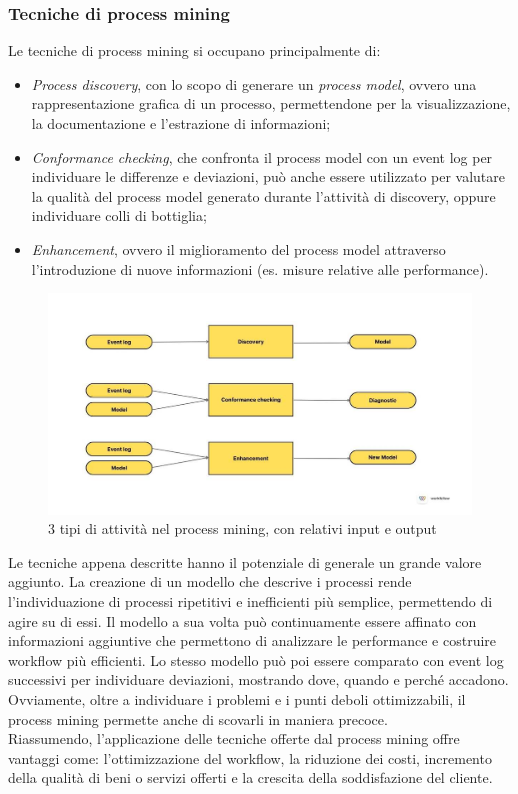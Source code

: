 \subsubsection{Tecniche di process mining}
Le tecniche di process mining si occupano principalmente di:
\begin{itemize}
\item \textit{Process discovery}, con lo scopo di generare un \textit{process model}, ovvero una rappresentazione grafica di un processo, permettendone per la visualizzazione, la documentazione e l'estrazione di informazioni;

\item \textit{Conformance checking}, che confronta il process model con un event log per individuare le differenze e deviazioni, può anche essere utilizzato per valutare la qualità del process model generato durante l'attività di discovery, oppure individuare colli di bottiglia;

\item \textit{Enhancement}, ovvero il miglioramento del process model attraverso l'introduzione di nuove informazioni (es. misure relative alle performance).
\end{itemize}

\begin{figure}[H] 
    \centering 
    \includegraphics[width=0.9\columnwidth]{immagini/process_mining_techniques.jpg} 
    \caption{3 tipi di attività nel process mining, con relativi input e output \cite{site:process-mining-techniques-img}}
\end{figure}

Le tecniche appena descritte hanno il potenziale di generale un grande valore aggiunto. La creazione di un modello che descrive i processi rende l'individuazione di processi ripetitivi e inefficienti più semplice, permettendo di agire su di essi. Il modello a sua volta può continuamente essere affinato con informazioni aggiuntive che permettono di analizzare le performance e costruire workflow più efficienti. Lo stesso modello può poi essere comparato con event log successivi per individuare deviazioni, mostrando dove, quando e perché accadono. 
\\
Ovviamente, oltre a individuare i problemi e i punti deboli ottimizzabili, il process mining permette anche di scovarli in maniera precoce.
\\
Riassumendo, l'applicazione delle tecniche offerte dal process mining offre vantaggi come: l'ottimizzazione del workflow, la riduzione dei costi, incremento della qualità di beni o servizi offerti e la crescita della soddisfazione del cliente.


